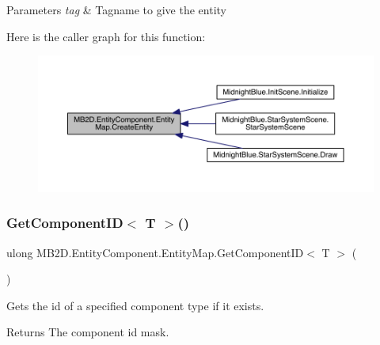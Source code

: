 \begin{DoxyParams}{Parameters}
{\em tag} & Tagname to give the entity\\
\hline
\end{DoxyParams}
Here is the caller graph for this function\+:\nopagebreak
\begin{figure}[H]
\begin{center}
\leavevmode
\includegraphics[width=350pt]{class_m_b2_d_1_1_entity_component_1_1_entity_map_a2461bfeb368018daadb2578c445f8fc2_icgraph}
\end{center}
\end{figure}
\hypertarget{class_m_b2_d_1_1_entity_component_1_1_entity_map_ad0a7991327281d908b72b33bc1944b70}{}\label{class_m_b2_d_1_1_entity_component_1_1_entity_map_ad0a7991327281d908b72b33bc1944b70} 
\subsubsection{\texorpdfstring{Get\+Component\+I\+D$<$ T $>$()}{GetComponentID< T >()}}
{\footnotesize\ttfamily ulong M\+B2\+D.\+Entity\+Component.\+Entity\+Map.\+Get\+Component\+ID$<$ T $>$ (\begin{DoxyParamCaption}{ }\end{DoxyParamCaption})\hspace{0.3cm}{\ttfamily [inline]}}



Gets the id of a specified component type if it exists. 

\begin{DoxyReturn}{Returns}
The component id mask.
\end{DoxyReturn}

